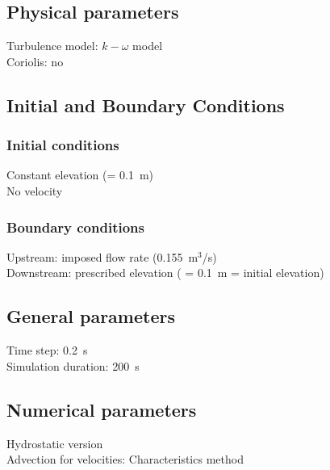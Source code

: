 \subsection{Physical parameters}
%
Turbulence model: $k-\omega$ model\\
Coriolis: no
%
%
%
%
%
%
\subsection{Initial and Boundary Conditions}
%
\subsubsection{Initial conditions}
%
Constant elevation (= 0.1~m)\\
No velocity
%
\subsubsection{Boundary conditions}
%
Upstream: imposed flow rate (0.155~m$^3$/s)\\
Downstream: prescribed elevation ( = 0.1~m = initial elevation)
%
\subsection{General parameters}
%
Time step: 0.2~s\\
Simulation duration: 200~s
%
%
%
\subsection{Numerical parameters}
%
Hydrostatic version\\
Advection for velocities: Characteristics method
%
